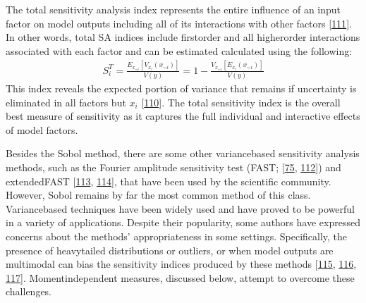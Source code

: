 \documentclass[letterpaper,10pt,english]{sphinxmanual}
\begin{document}
\sphinxAtStartPar
The total sensitivity analysis index represents the entire influence of an input factor on model outputs including all of its interactions with other factors {[}\hyperlink{cite.index:id150}{111}{]}. In other words, total SA indices include first\sphinxhyphen{}order and all higher\sphinxhyphen{}order interactions associated with each factor and can be estimated calculated using the following:
\begin{equation*}
\begin{split}S_i^T= \frac{E_{x_{\sim i}}[V_{x_i}(x_{\sim i})]}{V(y)} = 1 - \frac{V_{x_{\sim i}}[E_{x_{i}}(x_{\sim i})]}{V(y)}\end{split}
\end{equation*}
\sphinxAtStartPar
This index reveals the expected portion of variance that remains if uncertainty is eliminated in all factors but \(x_i\) {[}\hyperlink{cite.index:id149}{110}{]}. The total sensitivity index is the overall best measure of sensitivity as it captures the full individual and interactive effects of model factors.

\sphinxAtStartPar
Besides the Sobol method, there are some other variance\sphinxhyphen{}based sensitivity analysis methods, such as the Fourier amplitude sensitivity test (FAST; {[}\hyperlink{cite.index:id100}{75}, \hyperlink{cite.index:id151}{112}{]}) and extended\sphinxhyphen{}FAST {[}\hyperlink{cite.index:id152}{113}, \hyperlink{cite.index:id153}{114}{]}, that have been used by the scientific community. However, Sobol remains by far the most common method of this class. Variance\sphinxhyphen{}based techniques have been widely used and have proved to be powerful in a variety of applications. Despite their popularity, some authors have expressed concerns about the methods’ appropriateness in some settings. Specifically, the presence of heavy\sphinxhyphen{}tailed distributions or outliers, or when model outputs are multimodal can bias the sensitivity indices produced by these methods {[}\hyperlink{cite.index:id154}{115}, \hyperlink{cite.index:id155}{116}, \hyperlink{cite.index:id156}{117}{]}. Moment\sphinxhyphen{}independent measures, discussed below, attempt to overcome these challenges.
\end{document}
